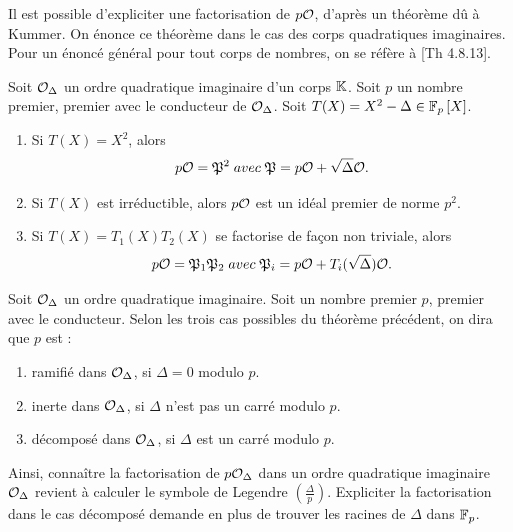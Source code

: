 Il est possible d'expliciter une factorisation de $p\mathcal{O}$, d'après un théorème dû à Kummer. On énonce ce théorème dans le cas des corps quadratiques imaginaires. Pour un énoncé général pour tout corps de nombres, on se réfère à \cite{Coh00}[Th 4.8.13].

\begin{The}\label{Kummer}
	
	Soit $\mathcal{O}_{\Delta}$ un ordre quadratique imaginaire d'un corps $\mathbb{K}$. Soit $p$ un nombre premier, premier avec le conducteur de $\mathcal{O}_\Delta$. Soit $T(X) = X^2 - \Delta \in\mathbb{F}_{p}\left[ X\right] $. 
	\begin{enumerate}
		\item Si $T(X) = X^2$, alors 
		\begin{equation*}
			p\mathcal{O} = \mathfrak{P}^{2}\; avec \; \mathfrak{P} = p\mathcal{O} + \sqrt{\Delta}\mathcal{O}.
		\end{equation*}
		
		\item Si $T(X)$ est irréductible, alors $p\mathcal{O}$ est un idéal premier de norme $p^{2}$.
		
		\item Si $T(X) = T_{1}(X)T_{2}(X)$ se factorise de façon non triviale, alors 
		\begin{equation*}
			p\mathcal{O} = \mathfrak{P}_{1}\mathfrak{P}_{2}\; avec \; \mathfrak{P}_{i} = p\mathcal{O} + T_{i}(\sqrt{\Delta})\mathcal{O}.
		\end{equation*}
		
	\end{enumerate}
\end{The}

\begin{Def}
	Soit $\mathcal{O}_\Delta$ un ordre quadratique imaginaire. Soit un nombre premier $p$, premier avec le conducteur. Selon les trois cas possibles du théorème précédent, on dira que $p$ est :
	\begin{enumerate}
		\item ramifié dans $\mathcal{O}_\Delta$, si $\Delta = 0$ modulo $p$.
		\item inerte dans $\mathcal{O}_\Delta$, si $\Delta$ n'est pas un carré modulo $p$.
		\item décomposé dans $\mathcal{O}_\Delta$, si $\Delta$ est un carré modulo $p$.
	\end{enumerate}
\end{Def}

Ainsi, connaître la factorisation de $p\mathcal{O}_\Delta$ dans un ordre quadratique imaginaire $\mathcal{O}_\Delta$ revient à calculer le symbole de Legendre $ \left( \frac{\Delta}{p}\right) $. Expliciter la factorisation dans le cas décomposé demande en plus de trouver les racines de $\Delta$ dans $\mathbb{F}_{p}$. 


